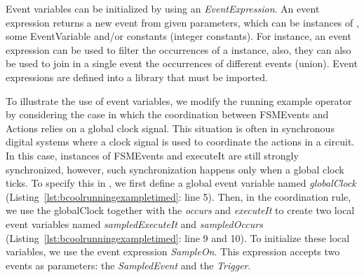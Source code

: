 Event variables can be initialized by using an \emph{EventExpression}. An event expression returns a new event from given parameters, which can be instances of \dse, some EventVariable and/or constants (\eg integer constants). For instance, an event expression can be used to filter the occurrences of a \dse instance, also, they can also be used to join in a single event the occurrences of different events (union). Event expressions are defined into a \moccml library that must be imported.   

To illustrate the use of event variables, we modify the running example operator by considering the case in which the coordination between FSMEvents and Actions relies on a global clock signal. This situation is often in synchronous digital systems where a clock signal is used to coordinate the actions in a circuit. In this case, instances of FSMEvents and executeIt are still strongly synchronized, however, such synchronization happens only when a global clock ticks. To specify this in \bcool, we first define a global event variable named \emph{globalClock} (Listing~\ref{lst:bcoolrunningexampletimed}: line 5). Then, in the coordination rule, we use the globalClock together with the \dse \emph{occurs} and \emph{executeIt} to create two local event variables named \emph{sampledExecuteIt} and \emph{sampledOccurs} (Listing~\ref{lst:bcoolrunningexampletimed}: line 9 and 10). To initialize these local variables, we use the event expression \emph{SampleOn}. This expression accepts two events as parameters: the \emph{SampledEvent} and the \emph{Trigger}. 


    


	
	
